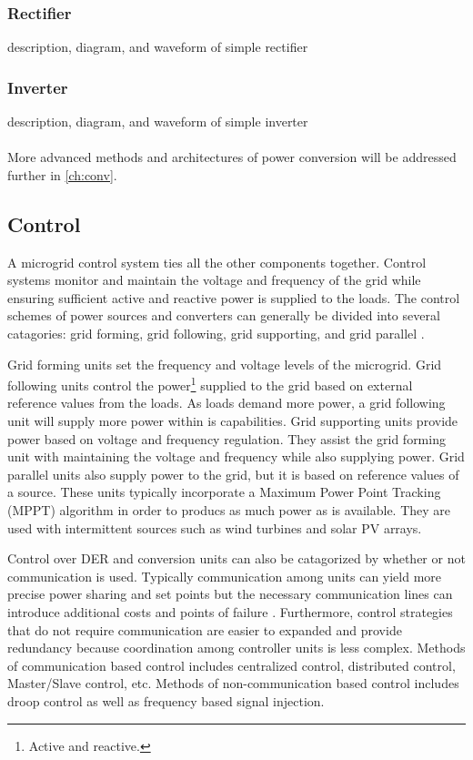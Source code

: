 \subsubsection{Rectifier}
description, diagram, and waveform of simple rectifier

\subsubsection{Inverter}
description, diagram, and waveform of simple inverter

\paragraph{}
More advanced methods and architectures of power conversion will be addressed further in \autoref{ch:conv}.

\subsection{Control}
A microgrid control system ties all the other components together. Control systems monitor and maintain the voltage and frequency of the grid while ensuring sufficient active and reactive power is supplied to the loads. The control schemes of power sources and converters can generally be divided into several catagories: grid forming, grid following, grid supporting, and grid parallel \cite{Ortjohann2012, Engler, Strauss2003}. 

Grid forming units set the frequency and voltage levels of the microgrid. Grid following units control the power\footnote{Active and reactive.} supplied to the grid based on external reference values from the loads. As loads demand more power, a grid following unit will supply more power within is capabilities. Grid supporting units provide power based on voltage and frequency regulation. They assist the grid forming unit with maintaining the voltage and frequency while also supplying power. Grid parallel units also supply power to the grid, but it is based on reference values of a source. These units typically incorporate a Maximum Power Point Tracking (MPPT) algorithm in order to producs as much power as is available. They are used with intermittent sources such as wind turbines and solar PV arrays. 

Control over DER and conversion units can also be catagorized by whether or not communication is used. Typically communication among units can yield more precise power sharing and set points but the necessary communication lines can introduce additional costs and points of failure \cite{Vandoorn2013}. Furthermore, control strategies that do not require communication are easier to expanded and provide redundancy because coordination among controller units is less complex. Methods of communication based control includes centralized control, distributed control, Master/Slave control, etc. Methods of non-communication based control includes droop control as well as frequency based signal injection.

